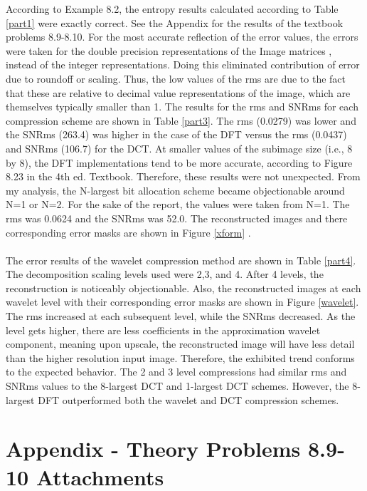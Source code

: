 \documentclass[./rarnold_project_89.tex]{subfiles}
\begin{document}
\noindent According to Example 8.2, the entropy results calculated according to Table \ref{part1} were exactly correct.  See the Appendix for the results of the textbook problems 8.9-8.10.  For the most accurate reflection of the error values, the errors were taken for the double precision representations of the Image matrices , instead of the integer representations.  Doing this eliminated contribution of error due to roundoff or scaling.  Thus, the low values of the rms are due to the fact that these are relative to decimal value representations of the image, which are themselves typically smaller than 1.  The results for the rms and SNRms for each compression scheme are shown in Table \ref{part3}.  The rms (0.0279) was lower and the SNRms (263.4) was higher in the case of the DFT versus the rms (0.0437) and SNRms (106.7) for the DCT.  At smaller values of the subimage size (i.e., 8 by 8), the DFT implementations tend to be more accurate, according to Figure 8.23 in the 4th ed. Textbook.  Therefore, these results were not unexpected.  From my analysis, the N-largest bit allocation scheme became objectionable around N=1 or N=2.  For the sake of the report, the values were taken from N=1.  The rms was 0.0624 and the SNRms was 52.0.  The reconstructed images and there corresponding error masks are shown in Figure \ref{xform} .
\\ \\
\noindent The error results of the wavelet compression method are shown in Table \ref{part4}.  The decomposition scaling levels used were 2,3, and 4.  After 4 levels, the reconstruction is noticeably objectionable.  Also, the reconstructed images at each wavelet level with their corresponding error masks are shown in Figure \ref{wavelet}.   The rms increased at each subsequent level, while the SNRms decreased.  As the level gets higher, there are less coefficients in the approximation wavelet component, meaning upon upscale, the reconstructed image will have less detail than the higher resolution input image.  Therefore, the exhibited trend conforms to the expected behavior.  The 2 and 3 level compressions had similar rms and SNRms values to the 8-largest DCT  and 1-largest DCT schemes.  However, the 8-largest DFT outperformed both the wavelet and DCT compression schemes.  

\clearpage
\section*{Appendix - Theory Problems 8.9-10 Attachments}
%

\end{document}
